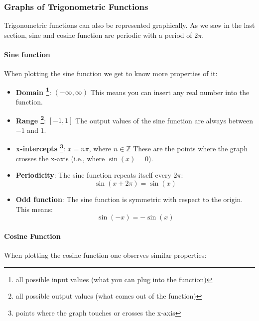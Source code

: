 \subsubsection{Graphs of Trigonometric Functions}

Trigonometric functions can also be represented graphically.
As we saw in the last section, sine and cosine function are periodic with a period of $2\pi$. 
\paragraph{Sine function}
When plotting the sine function we get to know more properties of it: 

\begin{itemize}
    \item \textbf{Domain \footnote{all possible input values (what you can plug into the function)}}: $(-\infty, \infty)$  
    This means you can insert any real number into the function.

    \item \textbf{Range \footnote{all possible output values (what comes out of the function)}}: $[-1,1]$  
    The output values of the sine function are always between $-1$ and $1$.

    \item \textbf{x-intercepts \footnote{points where the graph touches or crosses the x-axis}}: $x = n\pi$, where $n \in \mathbb{Z}$  
    These are the points where the graph crosses the x-axis (i.e., where $\sin(x)=0$).
    \item \textbf{Periodicity}:  
    The sine function repeats itself every $2\pi$:
    \begin{equation}
        \sin(x + 2\pi) = \sin(x)
    \end{equation}
    \item \textbf{Odd function}:  
    The sine function is symmetric with respect to the origin. This means:
    \begin{equation}
        \sin(-x) = -\sin(x)
    \end{equation}

\end{itemize}



\paragraph{Cosine Function}
When plotting the cosine function one observes similar properties:

